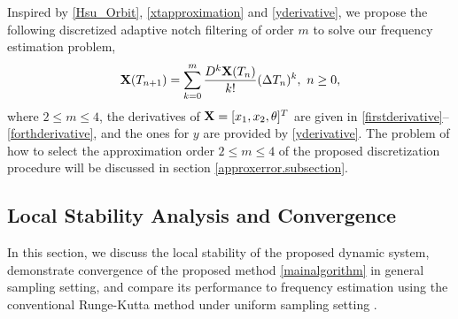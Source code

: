 \documentclass{UCF_ETD}
\begin{document}
Inspired by \eqref{Hsu_Orbit}, \eqref{xtapproximation} and \eqref{yderivative}, 
we propose the following discretized adaptive notch filtering of order $m$
to solve our frequency estimation problem,
\begin{equation}\label{mainalgorithm}
{\bf X}(T_{n+1})= \sum_{k=0}^m \frac{D^k {\bf  X}(T_n)}{k!} (\Delta T_n)^k, \  n\ge 0,
\end{equation}
where $2\le m\le  4$, the derivatives of ${\bf X}=[x_1, x_2, \theta]^T$ are given in \eqref{firstderivative}--\eqref{forthderivative},
and the ones for $y$ are  provided by \eqref{yderivative}.
 The problem of how to select the  approximation order $2 \leq m \leq 4$ of the proposed discretization procedure
 will be discussed in section \ref{approxerror.subsection}. 

\subsection{Local Stability Analysis and Convergence}
\label{convergence.subsection}
In this section, we discuss the local stability of the proposed dynamic system,
demonstrate convergence of the
proposed method  \eqref{mainalgorithm} in general  sampling setting,  and
compare its performance
to frequency estimation using the conventional
Runge-Kutta method under uniform sampling setting \cite{burden10}.
\end{document}
